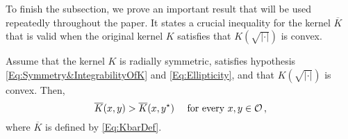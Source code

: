 To finish the subsection, we prove an important result that will be used repeatedly throughout the paper. It states a crucial inequality for the kernel $\overline{K}$ that is valid when the original kernel $K$ satisfies that $K(\sqrt{|\cdot|})$ is convex.

\begin{proposition}
	\label{Prop:KernelInequalityReflexion}
	Assume that the kernel $K$ is radially symmetric, satisfies hypothesis \eqref{Eq:Symmetry&IntegrabilityOfK} and \eqref{Eq:Ellipticity}, and that $K(\sqrt{|\cdot|})$ is convex. Then, 
	\begin{equation}
	\label{Eq:KernelInequalityReflexion}
    \overline{K}(x,y) > \overline{K}(x, y^\star) \quad \text{ for every }x,y \in \mathcal{O}\,,
	\end{equation}
    where $\overline{K}$ is defined by \eqref{Eq:KbarDef}.
\end{proposition}

